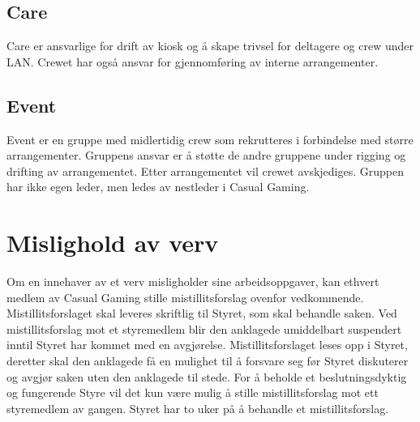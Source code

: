 \subsection{Care}
Care er ansvarlige for drift av kiosk og å skape trivsel for deltagere og crew under LAN. Crewet har også ansvar for gjennomføring av interne arrangementer.

\subsection{Event}
Event er en gruppe med midlertidig crew som rekrutteres i forbindelse med større arrangementer. Gruppens ansvar er å støtte de andre gruppene under rigging og drifting av arrangementet. Etter arrangementet vil crewet avskjediges. Gruppen har ikke egen leder, men ledes av nestleder i Casual Gaming.

\section{Mislighold av verv}
Om en innehaver av et verv misligholder sine arbeidsoppgaver, kan ethvert medlem av Casual Gaming stille mistillitsforslag ovenfor vedkommende. Mistillitsforslaget skal leveres skriftlig til Styret, som skal behandle saken. Ved mistillitsforslag mot et styremedlem blir den anklagede umiddelbart suspendert inntil Styret har kommet med en avgjørelse. Mistillitsforslaget leses opp i Styret, deretter skal den anklagede få en mulighet til å forsvare seg før Styret diskuterer og avgjør saken uten den anklagede til stede. For å beholde et beslutningsdyktig og fungerende Styre vil det kun være mulig å stille mistillitsforslag mot ett styremedlem av gangen. Styret har to uker på å behandle et mistillitsforslag.
